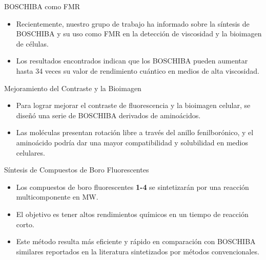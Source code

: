 \documentclass[%
spanish,
mexico]{beamer}
\begin{document}
\begin{frame}{BOSCHIBA como FMR}
    \begin{itemize}[<+- | alert@+>]
        \item Recientemente, nuestro grupo de trabajo ha informado sobre la síntesis de \gls{BOSCHIBA} y su uso como \gls{FMR} en la detección de viscosidad y la bioimagen de células.
        \item Los resultados encontrados indican que los \gls{BOSCHIBA} pueden aumentar hasta 34 veces su valor de rendimiento cuántico en medios de alta viscosidad.
    \end{itemize}
\end{frame}

\begin{frame}{Mejoramiento del Contraste y la Bioimagen}
    \begin{itemize}[<+- | alert@+>]
        \item Para lograr mejorar el contraste de fluorescencia y la bioimagen celular, se diseñó una serie de \gls{BOSCHIBA} derivados de aminoácidos.
        \item Las moléculas presentan rotación libre a través del anillo fenilborónico, y el aminoácido podría dar una mayor compatibilidad y solubilidad en medios celulares.
    \end{itemize}
\end{frame}

\begin{frame}{Síntesis de Compuestos de Boro Fluorescentes}
    \begin{itemize}[<+- | alert@+>]
        \item Los compuestos de boro fluorescentes \textbf{1-4} se sintetizarán por una reacción multicomponente en \gls{MW}.
        \item El objetivo es tener altos rendimientos químicos en un tiempo de reacción corto.
        \item Este método resulta más eficiente y rápido en comparación con \gls{BOSCHIBA} similares reportados en la literatura sintetizados por métodos convencionales.
    \end{itemize}
\end{frame}
\end{document}
